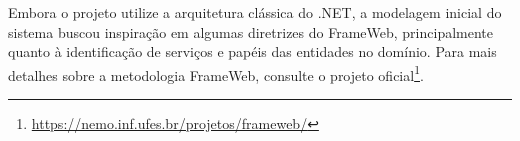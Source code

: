 Embora o projeto utilize a arquitetura clássica do .NET, a modelagem inicial do sistema buscou inspiração em algumas diretrizes do FrameWeb, principalmente quanto à identificação de serviços e papéis das entidades no domínio. Para mais detalhes sobre a metodologia FrameWeb, consulte o projeto oficial\footnote{\url{https://nemo.inf.ufes.br/projetos/frameweb/}}.


